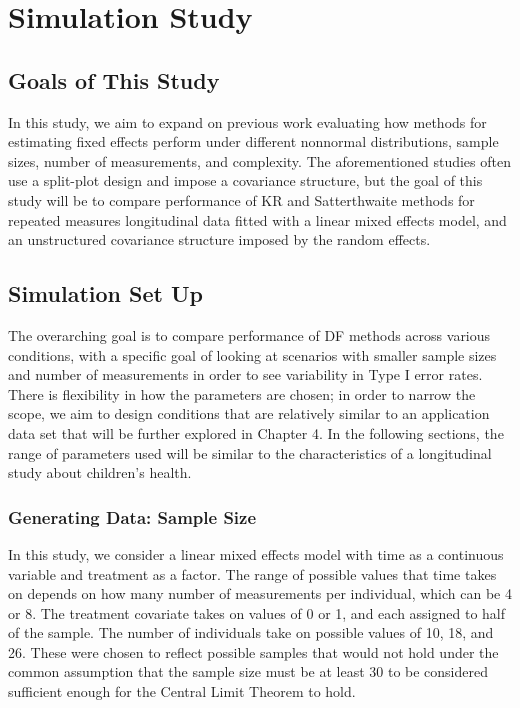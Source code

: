 \documentclass[12pt, twoside]{amherstthesis}
\begin{document}
\hypertarget{sim-study}{%
\chapter{Simulation Study}\label{sim-study}}

\hypertarget{goals-of-this-study}{%
\section{Goals of This Study}\label{goals-of-this-study}}

In this study, we aim to expand on previous work evaluating how methods for estimating fixed effects perform under different nonnormal distributions, sample sizes, number of measurements, and complexity. The aforementioned studies often use a split-plot design and impose a covariance structure, but the goal of this study will be to compare performance of KR and Satterthwaite methods for repeated measures longitudinal data fitted with a linear mixed effects model, and an unstructured covariance structure imposed by the random effects.

\hypertarget{simulation-set-up}{%
\section{Simulation Set Up}\label{simulation-set-up}}

The overarching goal is to compare performance of DF methods across various conditions, with a specific goal of looking at scenarios with smaller sample sizes and number of measurements in order to see variability in Type I error rates. There is flexibility in how the parameters are chosen; in order to narrow the scope, we aim to design conditions that are relatively similar to an application data set that will be further explored in Chapter 4. In the following sections, the range of parameters used will be similar to the characteristics of a longitudinal study about children's health.

\hypertarget{generating-data-sample-size}{%
\subsection{Generating Data: Sample Size}\label{generating-data-sample-size}}

In this study, we consider a linear mixed effects model with time as a continuous variable and treatment as a factor. The range of possible values that time takes on depends on how many number of measurements per individual, which can be 4 or 8. The treatment covariate takes on values of 0 or 1, and each assigned to half of the sample. The number of individuals take on possible values of 10, 18, and 26. These were chosen to reflect possible samples that would not hold under the common assumption that the sample size must be at least 30 to be considered sufficient enough for the Central Limit Theorem to hold.
\end{document}
